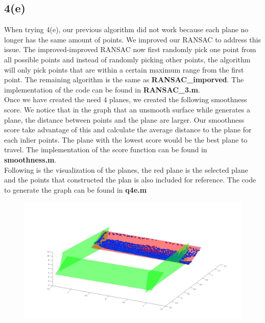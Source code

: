 \documentclass{article}
\begin{document}
\subsection*{4(e)}
When trying 4(e), our previous algorithm did not work because each plane no longer has the same amount of points. We improved our RANSAC to address this issue. The improved-improved RANSAC now first randomly pick one point from all possible points and instead of randomly picking other points, the algorithm will only pick points that are within a certain maximum range from the first point. The remaining algorithm is the same as \textbf{RANSAC\_imporved}. The implementation of the code can be found in \textbf{RANSAC\_3.m}.\\
Once we have created the need 4 planes, we created the following smoothness score. We notice that in the graph that an unsmooth surface while generates a plane, the distance between points and the plane are larger. Our smoothness score take advantage of this and calculate the average distance to the plane for each inlier points. The plane with the lowest score would be the best plane to travel. The implementation of the score function can be found in \textbf{smoothness.m}.\\
Following is the visualization of the planes, the red plane is the selected plane and the points that constructed the plan is also included for reference. The code to generate the graph can be found in \textbf{q4e.m}
\begin{figure}[H]
\centering
\includegraphics[width=5in]{figures/q4e.jpg}
\end{figure}
\end{document}
